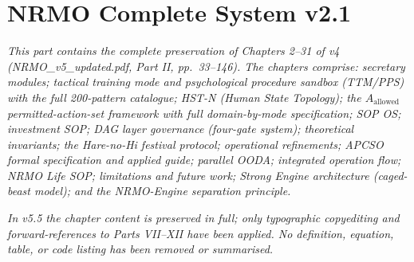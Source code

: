 
\part{NRMO Complete System v2.1}

\noindent\textit{This part contains the complete preservation of
Chapters 2--31 of v4 (NRMO\_v5\_updated.pdf, Part II, pp.\ 33--146).
The chapters comprise: secretary modules; tactical training mode and
psychological procedure sandbox (TTM/PPS) with the full 200-pattern
catalogue; HST-N (Human State Topology); the $A_{\mathrm{allowed}}$
permitted-action-set framework with full domain-by-mode
specification; SOP OS; investment SOP; DAG layer governance
(four-gate system); theoretical invariants; the Hare-no-Hi festival
protocol; operational refinements; APCSO formal specification and
applied guide; parallel OODA; integrated operation flow; NRMO Life
SOP; limitations and future work; Strong Engine architecture
(caged-beast model); and the NRMO-Engine separation principle.}

\noindent\textit{In v5.5 the chapter content is preserved in full;
only typographic copyediting and forward-references to Parts
VII--XII have been applied. No definition, equation, table, or code
listing has been removed or summarised.}























